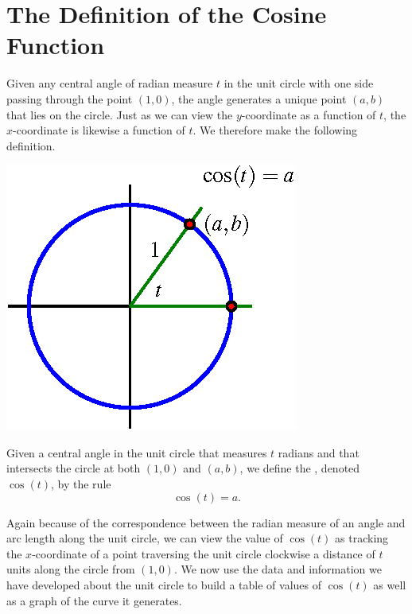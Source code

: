 \documentclass[nooutcomes]{ximera}
\begin{document}
\begin{center}  
\end{center} 


\section{The Definition of the Cosine Function}

Given any central angle of radian measure \(t\) in the unit circle with one side passing through the point \((1,0)\), the angle generates a unique point \((a,b)\) that lies on the circle.  Just as we can view the \(y\)-coordinate as a function of \(t\), the \(x\)-coordinate is likewise a function of \(t\).  We therefore make the following definition.

\begin{definition}
\begin{image}
\includegraphics{sine-defn-cosine.png}
\end{image}
Given a central angle in the unit circle that measures \(t\) radians and that intersects the circle at both \((1,0)\) and \((a,b)\), we define the , denoted \(\cos(t)\), by the rule
\begin{equation*}
\cos(t) = a\text{.}
\end{equation*}
\end{definition}

Again because of the correspondence between the radian measure of an angle and arc length along the unit circle, we can view the value of \(\cos(t)\) as tracking the \(x\)-coordinate of a point traversing the unit circle clockwise a distance of \(t\) units along the circle from \((1,0)\).  We now use the data and information we have developed about the unit circle to build a table of values of \(\cos(t)\) as well as a graph of the curve it generates.
\end{document}
